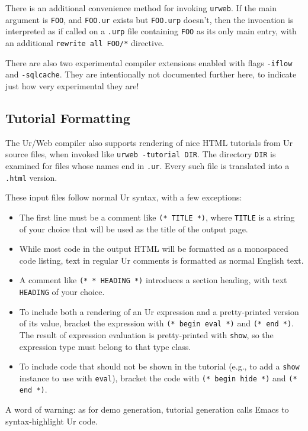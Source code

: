 \documentclass{article}
\newcommand{\cd}[1]{\texttt{#1}}
\begin{document}
There is an additional convenience method for invoking \texttt{urweb}.  If the main argument is \texttt{FOO}, and \texttt{FOO.ur} exists but \texttt{FOO.urp} doesn't, then the invocation is interpreted as if called on a \texttt{.urp} file containing \texttt{FOO} as its only main entry, with an additional \texttt{rewrite all FOO/*} directive.

There are also two experimental compiler extensions enabled with flags \texttt{-iflow} and \texttt{-sqlcache}.  They are intentionally not documented further here, to indicate just how very experimental they are!

\subsection{Tutorial Formatting}

The Ur/Web compiler also supports rendering of nice HTML tutorials from Ur source files, when invoked like \cd{urweb -tutorial DIR}.  The directory \cd{DIR} is examined for files whose names end in \cd{.ur}.  Every such file is translated into a \cd{.html} version.

These input files follow normal Ur syntax, with a few exceptions:
\begin{itemize}
\item The first line must be a comment like \cd{(* TITLE *)}, where \cd{TITLE} is a string of your choice that will be used as the title of the output page.
\item While most code in the output HTML will be formatted as a monospaced code listing, text in regular Ur comments is formatted as normal English text.
\item A comment like \cd{(* * HEADING *)} introduces a section heading, with text \cd{HEADING} of your choice.
\item To include both a rendering of an Ur expression and a pretty-printed version of its value, bracket the expression with \cd{(* begin eval *)} and \cd{(* end *)}.  The result of expression evaluation is pretty-printed with \cd{show}, so the expression type must belong to that type class.
\item To include code that should not be shown in the tutorial (e.g., to add a \cd{show} instance to use with \cd{eval}), bracket the code with \cd{(* begin hide *)} and \cd{(* end *)}.
\end{itemize}

A word of warning: as for demo generation, tutorial generation calls Emacs to syntax-highlight Ur code.
\end{document}
